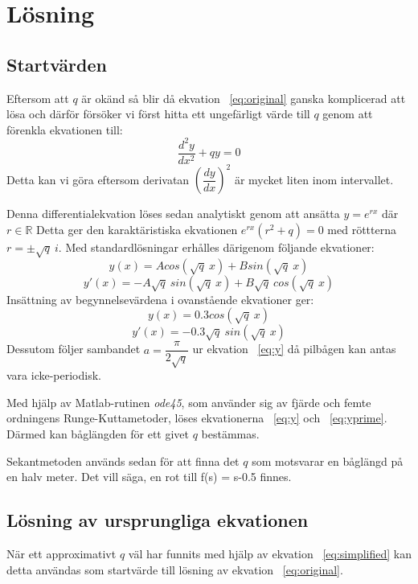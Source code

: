 \documentclass[a4paper,11pt,twoside]{article}
\begin{document}
\section{Lösning}
\subsection{Startvärden}
Eftersom att $q$ är okänd så blir då ekvation ~\eqref{eq:original} ganska komplicerad att lösa och därför försöker vi först hitta ett ungefärligt värde till $q$ genom att förenkla ekvationen till:
\begin{equation} \label{eq:simplified}
	\dfrac{d^2y}{dx^2} + qy = 0
\end{equation}
Detta kan vi göra eftersom derivatan $\left(\dfrac{dy}{dx}\right)^2$ är mycket liten
inom intervallet.

Denna differentialekvation löses sedan analytiskt genom att ansätta $y=e^{rx}$ där $r \in \mathbb{R}$
Detta ger den karaktäristiska ekvationen $e^{rx}(r^2+q)=0$ med röttterna $r=\pm \sqrt{q}\:i$.
Med standardlösningar erhålles därigenom följande ekvationer:
\begin{equation}
 y(x) = A cos(\sqrt{q}\:x)+B sin(\sqrt{q}\:x) \nonumber
\end{equation}
\begin{equation}
 y'(x) = -A\sqrt{q}\: sin(\sqrt{q}\:x) + B\sqrt{q}\:cos(\sqrt{q}\:x) \nonumber
\end{equation}
Insättning av begynnelsevärdena i ovanstående ekvationer ger:
\begin{equation} \label{eq:y}
 y(x) = 0.3 cos(\sqrt{q}\:x)
\end{equation}
\begin{equation} \label{eq:yprime}
 y'(x) = -0.3\sqrt{q}\: sin(\sqrt{q}\:x)
\end{equation}
Dessutom följer sambandet $a=\dfrac{\pi}{2\sqrt{q}}$ ur ekvation ~\eqref{eq:y} då pilbågen kan antas vara icke-periodisk.

Med hjälp av Matlab-rutinen \textit{ode45}, som använder sig av fjärde och femte ordningens Runge-Kuttametoder, löses ekvationerna ~\eqref{eq:y} och ~\eqref{eq:yprime}. Därmed kan båglängden för ett givet $q$ bestämmas.

Sekantmetoden används sedan för att finna det $q$ som motsvarar en båglängd på en halv meter. Det vill säga, en rot till f(s) = s-0.5 finnes.

\subsection{Lösning av ursprungliga ekvationen}
När ett approximativt $q$ väl har funnits med hjälp av ekvation ~\eqref{eq:simplified} kan detta användas som startvärde till lösning av ekvation ~\eqref{eq:original}.
\end{document}
